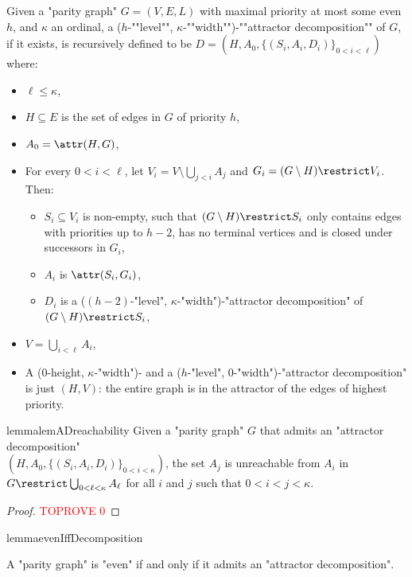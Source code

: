 \documentclass[a4paper,UKenglish,cleveref, autoref, thm-restate]{lipics-v2021}
\renewcommand{\leq}{\leqslant}
\begin{document}
\AP Given a "parity graph" $G=(V,E,L)$ with maximal priority at most some even $h$, and $\kappa$ an ordinal, a ($h$-""level"", $\kappa$-""width"")-""attractor decomposition"" of $G$, if it exists, is recursively defined to be $D=(H,A_0,\{(S_i,A_i,D_i)\}_{0<i<\ell})$ where:
\begin{itemize}
	\item $\ell\leq \kappa$,
	\item $H\subseteq E$ is the set of edges in $G$ of priority $h$,
	\item $A_0= \attr(H,G)$,
	\item For every $0<i<\ell$, let $V_i=V\setminus \bigcup_{j< i}A_j$ and $G_i=(G\setminus H)\restrict V_i$. Then:
	\begin{itemize}
		\item $S_i\subseteq V_i$  is non-empty, such that $(G\setminus H)\restrict S_i$ only contains edges with priorities up to $h{-}2$, has no terminal vertices and is closed under successors in $G_i$,
		\item $A_i$ is  $\attr(S_i,G_i)$,
		\item $D_i$ is a ($(h{-}2)$-"level", $\kappa$-"width")-"attractor decomposition" of $(G\setminus H) \restrict S_i$,
	\end{itemize}
	\item $V=\bigcup_{i<\ell} A_i$,
	\item A ($0$-height, $\kappa$-"width")- and a ($h$-"level", $0$-"width")-"attractor decomposition" is just $(H,V)$: the entire graph is in the attractor of the edges of highest priority.
\end{itemize}


\begin{restatable}{lemma}{lemADreachability}\label{cl:ADreachability}	
	Given a "parity graph" $G$ that admits an "attractor decomposition"\\
	$(H, A_0,\{(S_i,A_i,D_i)\}_{0<i < \kappa})$, the set $A_j$ is unreachable from $A_i$ in $G\restrict \bigcup_{0<\ell < \kappa} A_{\ell}$ for all $i$ and $j$ such that $0<i<j < \kappa$.
\end{restatable}

\begin{proof}\textcolor{red}{TOPROVE 0}\end{proof}


\begin{restatable}{lemma}{evenIffDecomposition}\label{cl:EvenIffDecomposition}
	
	A "parity graph" is "even" if and only if it admits an "attractor decomposition".
	
	
\end{restatable}
\end{document}
